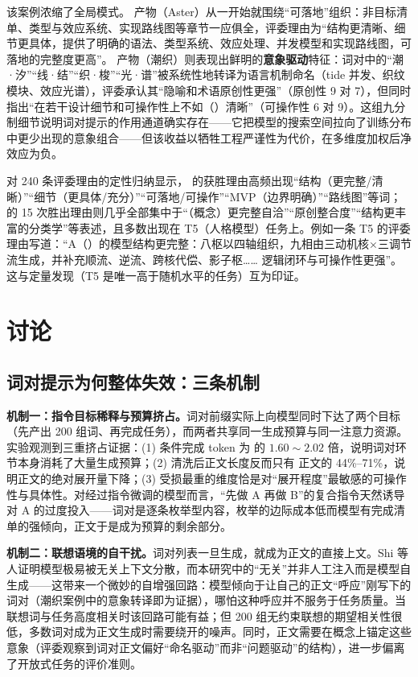 该案例浓缩了全局模式。\baseline{} 产物（Aster）从一开始就围绕“可落地”组织：非目标清单、类型与效应系统、实现路线图等章节一应俱全，评委理由为“结构更清晰、细节更具体，提供了明确的语法、类型系统、效应处理、并发模型和实现路线图，可落地的完整度更高”。\wordpairs{} 产物（潮织）则表现出鲜明的\textbf{意象驱动}特征：词对中的“潮·汐”“线·结”“织·梭”“光·谱”被系统性地转译为语言机制命名（tide 并发、织纹模块、效应光谱），评委承认其“隐喻和术语原创性更强”（原创性 9 对 7），但同时指出“在若干设计细节和可操作性上不如（\baseline{}）清晰”（可操作性 6 对 9）。这组九分制细节说明词对提示的作用通道确实存在——它把模型的搜索空间拉向了训练分布中更少出现的意象组合——但该收益以牺牲工程严谨性为代价，在多维度加权后净效应为负。

对 240 条评委理由的定性归纳显示，\baseline{} 的获胜理由高频出现“结构（更完整/清晰）”“细节（更具体/充分）”“可落地/可操作”“MVP（边界明确）”“路线图”等词；\wordpairs{} 的 15 次胜出理由则几乎全部集中于“（概念）更完整自洽”“原创整合度”“结构更丰富的分类学”等表述，且多数出现在 T5（人格模型）任务上。例如一条 T5 的评委理由写道：“A（\wordpairs{}）的模型结构更完整：八枢以四轴组织，九相由三动机核$\times$三调节流生成，并补充顺流、逆流、跨核代偿、影子枢…… 逻辑闭环与可操作性更强”。这与定量发现（T5 是唯一高于随机水平的任务）互为印证。

\section{讨论}\label{sec:discussion}

\subsection{词对提示为何整体失效：三条机制}

\textbf{机制一：指令目标稀释与预算挤占。}词对前缀实际上向模型同时下达了两个目标（先产出 200 组词、再完成任务），而两者共享同一生成预算与同一注意力资源。实验观测到三重挤占证据：(1) \wordpairs{} 条件完成 token 为 \baseline{} 的 $1.60\sim2.02$ 倍，说明词对环节本身消耗了大量生成预算；(2) 清洗后正文长度反而只有 \baseline{} 正文的 44\%--71\%，说明正文的绝对展开量下降；(3) 受损最重的维度恰是对“展开程度”最敏感的可操作性与具体性。对经过指令微调的模型而言，“先做 A 再做 B”的复合指令天然诱导对 A 的过度投入\cite{ouyang2022instructgpt}——词对是逐条枚举型内容，枚举的边际成本低而模型有完成清单的强倾向，正文于是成为预算的剩余部分。

\textbf{机制二：联想语境的自干扰。}词对列表一旦生成，就成为正文的直接上文。Shi 等人证明模型极易被无关上下文分散\cite{shi2023distracted}，而本研究中的“无关”并非人工注入而是模型自生成——这带来一个微妙的自增强回路：模型倾向于让自己的正文“呼应”刚写下的词对（潮织案例中的意象转译即为证据），哪怕这种呼应并不服务于任务质量。当联想词与任务高度相关时该回路可能有益；但 200 组无约束联想的期望相关性很低，多数词对成为正文生成时需要绕开的噪声。同时，正文需要在概念上锚定这些意象（评委观察到词对正文偏好“命名驱动”而非“问题驱动”的结构），进一步偏离了开放式任务的评价准则。

